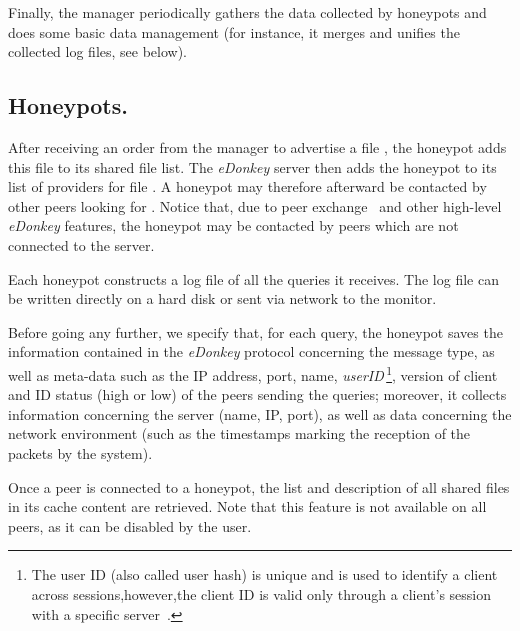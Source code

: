 \documentclass[final,
notitlepage,
narroweqnarray,
	inline,
	twoside,
]{ieee}
\begin{document}
Finally, the manager periodically gathers the data collected by honeypots
and does some basic data management
(for instance, it merges and unifies the
collected log files, see below). 

\subsection{Honeypots.} 
After receiving an
order from the manager to advertise a file  ,
the honeypot adds this file to its
shared file list.
The {\em eDonkey} server then adds the honeypot to its list  of 
providers for file . 
A honeypot may therefore afterward be contacted by other peers  looking for .
Notice that, due to peer exchange~\cite{kad} and other high-level {\em eDonkey} features, 
the honeypot may be contacted by peers which are not connected to the server.

Each honeypot constructs a log file of all the queries it receives.
The log file can be written directly on a hard disk or sent via
network to the monitor.

Before going any further, we specify that,
for each query, the honeypot saves the information contained in the {\em eDonkey}
protocol concerning the message type, as well as
meta-data such as the IP address, port, name, {\em userID}\,\footnote{The user ID (also called user hash) is unique and is used to identify a client across sessions,however,the client ID is valid only through a client's session with a specific server~\cite{edonkey}. }, 
version of client and ID status (high or low)
of the peers sending the queries;
moreover, it collects information concerning the server
(name, IP, port),
 as well as data concerning the
network environment (such as the timestamps marking the reception of the
packets by the system).

Once a peer is connected to a honeypot, the list and description of all
shared files in its cache content are retrieved. Note that this feature is not available
on all peers, as it can be disabled by the user.
\end{document}
